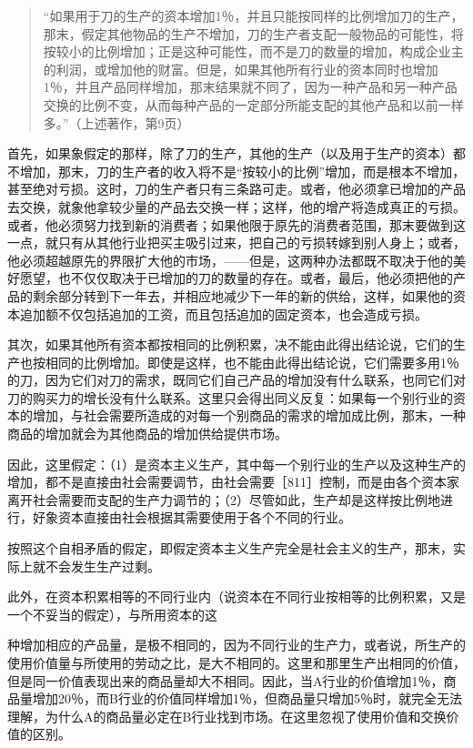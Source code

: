 \begin{quote}{“如果用于刀的生产的资本增加1％，并且只能按同样的比例增加刀的生产，那末，假定其他物品的生产不增加，刀的生产者支配一般物品的可能性，将按较小的比例增加；正是这种可能性，而不是刀的数量的增加，构成企业主的利润，或增加他的财富。但是，如果其他所有行业的资本同时也增加1％，并且产品同样增加，那末结果就不同了，因为一种产品和另一种产品交换的比例不变，从而每种产品的一定部分所能支配的其他产品和以前一样多。”（上述著作，第9页）}\end{quote}

首先，如果象假定的那样，除了刀的生产，其他的生产（以及用于生产的资本）都不增加，那末，刀的生产者的收入将不是“按较小的比例”增加，而是根本不增加，甚至绝对亏损。这时，刀的生产者只有三条路可走。或者，他必须拿已增加的产品去交换，就象他拿较少量的产品去交换一样；这样，他的增产将造成真正的亏损。或者，他必须努力找到新的消费者；如果他限于原先的消费者范围，那末要做到这一点，就只有从其他行业把买主吸引过来，把自己的亏损转嫁到别人身上；或者，他必须超越原先的界限扩大他的市场，——但是，这两种办法都既不取决于他的美好愿望，也不仅仅取决于已增加的刀的数量的存在。或者，最后，他必须把他的产品的剩余部分转到下一年去，并相应地减少下一年的新的供给，这样，如果他的资本追加额不仅包括追加的工资，而且包括追加的固定资本，也会造成亏损。

其次，如果其他所有资本都按相同的比例积累，决不能由此得出结论说，它们的生产也按相同的比例增加。即使是这样，也不能由此得出结论说，它们需要多用1％的刀，因为它们对刀的需求，既同它们自己产品的增加没有什么联系，也同它们对刀的购买力的增长没有什么联系。这里只会得出同义反复：如果每一个别行业的资本的增加，与社会需要所造成的对每一个别商品的需求的增加成比例，那末，一种商品的增加就会为其他商品的增加供给提供市场。

因此，这里假定：（1）是资本主义生产，其中每一个别行业的生产以及这种生产的增加，都不是直接由社会需要调节，由社会需要［811］控制，而是由各个资本家离开社会需要而支配的生产力调节的；（2）尽管如此，生产却是这样按比例地进行，好象资本直接由社会根据其需要使用于各个不同的行业。

按照这个自相矛盾的假定，即假定资本主义生产完全是社会主义的生产，那末，实际上就不会发生生产过剩。

此外，在资本积累相等的不同行业内（说资本在不同行业按相等的比例积累，又是一个不妥当的假定），与所用资本的这

种增加相应的产品量，是极不相同的，因为不同行业的生产力，或者说，所生产的使用价值量与所使用的劳动之比，是大不相同的。这里和那里生产出相同的价值，但是同一价值表现出来的商品量却大不相同。因此，当A行业的价值增加1％，商品量增加20％，而B行业的价值同样增加1％，但商品量只增加5％时，就完全无法理解，为什么A的商品量必定在B行业找到市场。在这里忽视了使用价值和交换价值的区别。

